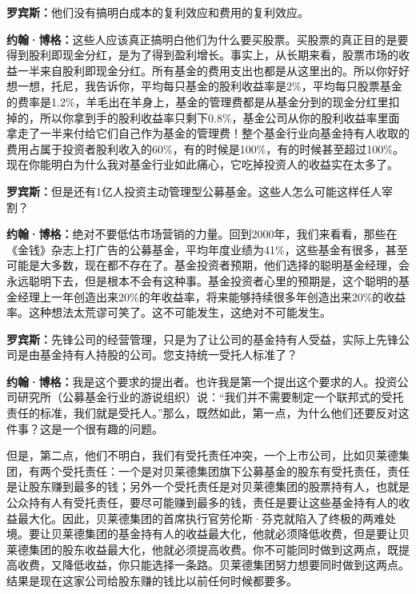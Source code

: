 \begin{BookQuote}
\textbf{罗宾斯：}他们没有搞明白成本的复利效应和费用的复利效应。
\end{BookQuote}

\begin{BookQuote}
\textbf{约翰·博格：}这些人应该真正搞明白他们为什么要买股票。买股票的真正目的是要得到股利即现金分红，是为了得到盈利增长。事实上，从长期来看，股票市场的收益一半来自股利即现金分红。所有基金的费用支出也都是从这里出的。所以你好好想一想，托尼，我告诉你，平均每只基金的股利收益率是2\%，平均每只股票基金的费率是1.2\%，羊毛出在羊身上，基金的管理费都是从基金分到的现金分红里扣掉的，所以你拿到手的股利收益率只剩下0.8\%，基金公司从你的股利收益率里面拿走了一半来付给它们自己作为基金的管理费！整个基金行业向基金持有人收取的费用占属于投资者股利收入的60\%，有的时候是100\%，有的时候甚至超过100\%。现在你能明白为什么我对基金行业如此痛心，它吃掉投资人的收益实在太多了。
\end{BookQuote}

\begin{BookQuote}
\textbf{罗宾斯：}但是还有1亿人投资主动管理型公募基金。这些人怎么可能这样任人宰割？
\end{BookQuote}

\begin{BookQuote}
\textbf{约翰·博格：}绝对不要低估市场营销的力量。回到2000年，我们来看看，那些在《金钱》杂志上打广告的公募基金，平均年度业绩为41\%，这些基金有很多，甚至可能是大多数，现在都不存在了。基金投资者预期，他们选择的聪明基金经理，会永远聪明下去，但是根本不会有这种事。基金投资者心里的预期是，这个聪明的基金经理上一年创造出来20\%的年收益率，将来能够持续很多年创造出来20\%的收益率。这种想法太荒谬可笑了。这不可能发生，这绝对不可能发生。
\end{BookQuote}

\begin{BookQuote}
\textbf{罗宾斯：}先锋公司的经营管理，只是为了让公司的基金持有人受益，实际上先锋公司是由基金持有人持股的公司。您支持统一受托人标准了？
\end{BookQuote}

\begin{BookQuote}
\textbf{约翰·博格：}我是这个要求的提出者。也许我是第一个提出这个要求的人。投资公司研究所（公募基金行业的游说组织）说：“我们并不需要制定一个联邦式的受托责任的标准，我们就是受托人。”那么，既然如此，第一点，为什么他们还要反对这件事？这是一个很有趣的问题。
\end{BookQuote}

但是，第二点，他们不明白，我们有受托责任冲突，一个上市公司，比如贝莱德集团，有两个受托责任：一个是对贝莱德集团旗下公募基金的股东有受托责任，责任是让股东赚到最多的钱；另外一个受托责任是对贝莱德集团的股票持有人，也就是公众持有人有受托责任，要尽可能赚到最多的钱，责任是要让这些基金持有人的收益最大化。因此，贝莱德集团的首席执行官劳伦斯·芬克就陷入了终极的两难处境。要让贝莱德集团的基金持有人的收益最大化，他就必须降低收费，但是要让贝莱德集团的股东收益最大化，他就必须提高收费。你不可能同时做到这两点，既提高收费，又降低收益，你只能选择一条路。贝莱德集团努力想要同时做到这两点。结果是现在这家公司给股东赚的钱比以前任何时候都要多。

